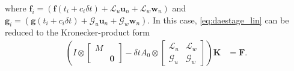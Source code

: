 \documentclass[review]{siamart}
\begin{document}
%
where $\mathbf{f}_i = ( \mathbf{f}(t_i + c_i\delta t) + \mathcal{L}_u\mathbf{u}_n
+ \mathcal{L}_w\mathbf{w}_n) $ and $\mathbf{g}_i = (\mathbf{g}(t_i + c_i\delta t) +
\mathcal{G}_u\mathbf{u}_n + \mathcal{G}_w\mathbf{w}_n)$. In this case,
\eqref{eq:daestage_lin} can be reduced to the Kronecker-product form
%
\begin{align*}
\left( I\otimes \begin{bmatrix} M \\ & \mathbf{0}\end{bmatrix} 
	- \delta t A_0\otimes
		\begin{bmatrix} \mathcal{L}_{u} & \mathcal{L}_{w} \\
			\mathcal{G}_{u} & \mathcal{G}_w \end{bmatrix}\right)
	\mathbf{K} 
& = \mathbf{F}.
\end{align*}
%
\end{document}
